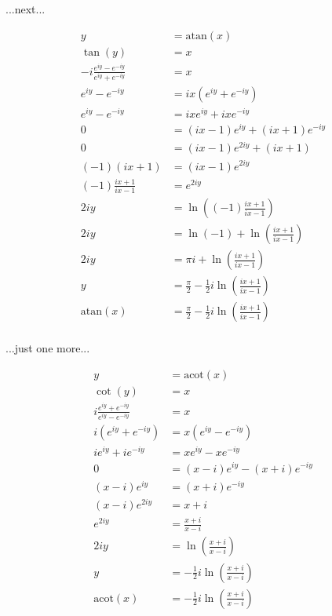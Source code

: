 \documentclass[10pt]{article}
\begin{document}
\begin{multicols}{2}
...next...

\begin{align*}
    y &= \mathrm{atan}(x) \\
    \tan(y) &= x \\
    -i \frac{e^{iy} - e^{-iy}}{e^{iy} + e^{-iy}} &= x \\
    e^{iy} - e^{-iy} &= ix (e^{iy} + e^{-iy}) \\
    e^{iy} - e^{-iy} &= ix e^{iy} + ix e^{-iy} \\
    0 &= (ix - 1) e^{iy} + (ix + 1) e^{-iy} \\
    0 &= (ix - 1) e^{2iy} + (ix + 1) \\
    (-1) (ix + 1) &= (ix - 1) e^{2iy} \\
    (-1) \frac{ix + 1}{ix - 1} &= e^{2iy} \\
    2iy &= \ln( (-1) \frac{ix + 1}{ix - 1} ) \\
    2iy &= \ln(-1) + \ln(\frac{ix + 1}{ix - 1}) \\
    2iy &= πi + \ln(\frac{ix + 1}{ix - 1}) \\
    y &= \frac{π}{2} - \frac{1}{2} i \ln(\frac{ix + 1}{ix - 1}) \\
    \mathrm{atan}(x) &= \frac{π}{2} - \frac{1}{2} i \ln(\frac{ix + 1}{ix - 1}) \\
\end{align*}

...just one more...

\begin{align*}
    y &= \mathrm{acot}(x) \\
    \cot(y) &= x \\
    i \frac{e^{iy} + e^{-iy}}{e^{iy} - e^{-iy}} &= x \\
    i (e^{iy} + e^{-iy}) &= x (e^{iy} - e^{-iy}) \\
    i e^{iy} + i e^{-iy} &= x e^{iy} - x e^{-iy} \\
    0 &= (x - i) e^{iy} - (x + i) e^{-iy} \\
    (x - i) e^{iy} &= (x + i) e^{-iy} \\
    (x - i) e^{2iy} &= x + i \\
    e^{2iy} &= \frac{x + i}{x - i} \\
    2iy &= \ln( \frac{x + i}{x - i} ) \\
    y &= - \frac{1}{2} i \ln( \frac{x + i}{x - i} ) \\
    \mathrm{acot}(x) &= - \frac{1}{2} i \ln( \frac{x + i}{x - i} ) \\
\end{align*}


\end{multicols}
\end{document}
